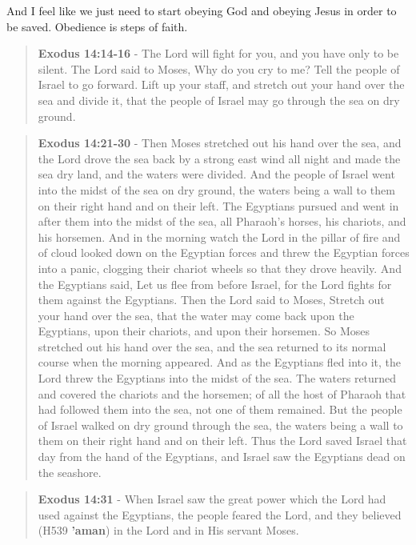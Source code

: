 \documentclass[11pt]{article}
\begin{document}
And I feel like we just need to start obeying God and obeying Jesus in order to be saved. Obedience is steps of faith.

\begin{quote}
\textbf{Exodus 14:14-16} - The Lord will fight for you, and you have only to be silent.  The Lord said to Moses, Why do you cry to me? Tell the people of Israel to go forward.  Lift up your staff, and stretch out your hand over the sea and divide it, that the people of Israel may go through the sea on dry ground.
\end{quote}

\begin{quote}
\textbf{Exodus 14:21-30} - Then Moses stretched out his hand over the sea, and the Lord drove the sea back by a strong east wind all night and made the sea dry land, and the waters were divided. And the people of Israel went into the midst of the sea on dry ground, the waters being a wall to them on their right hand and on their left. The Egyptians pursued and went in after them into the midst of the sea, all Pharaoh's horses, his chariots, and his horsemen. And in the morning watch the Lord in the pillar of fire and of cloud looked down on the Egyptian forces and threw the Egyptian forces into a panic, clogging their chariot wheels so that they drove heavily. And the Egyptians said, Let us flee from before Israel, for the Lord fights for them against the Egyptians. Then the Lord said to Moses, Stretch out your hand over the sea, that the water may come back upon the Egyptians, upon their chariots, and upon their horsemen. So Moses stretched out his hand over the sea, and the sea returned to its normal course when the morning appeared. And as the Egyptians fled into it, the Lord threw the Egyptians into the midst of the sea. The waters returned and covered the chariots and the horsemen; of all the host of Pharaoh that had followed them into the sea, not one of them remained. But the people of Israel walked on dry ground through the sea, the waters being a wall to them on their right hand and on their left. Thus the Lord saved Israel that day from the hand of the Egyptians, and Israel saw the Egyptians dead on the seashore.
\end{quote}

\begin{quote}
\textbf{Exodus 14:31} - When Israel saw the great power which the Lord had used against the Egyptians, the people feared the Lord, and they believed (H539 \textbf{'aman}) in the Lord and in His servant Moses.
\end{quote}
\end{document}
